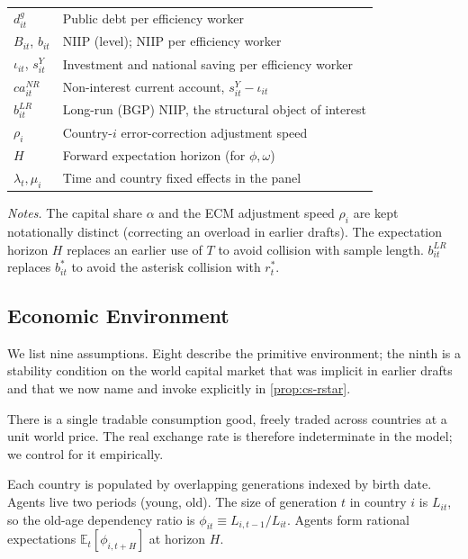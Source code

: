 \begin{table}[t]
\begin{threeparttable}
\begin{tabular}{ll}
$d_{it}^g$ & Public debt per efficiency worker \\
$B_{it}$, $b_{it}$ & NIIP (level); NIIP per efficiency worker \\
$\iota_{it}$, $s_{it}^Y$ & Investment and national saving per efficiency worker \\
$ca_{it}^{NR}$ & Non-interest current account, $s_{it}^Y-\iota_{it}$ \\
$b_{it}^{LR}$ & Long-run (BGP) NIIP, the structural object of interest \\
$\rho_i$ & Country-$i$ error-correction adjustment speed \\
$H$ & Forward expectation horizon (for $\phi,\omega$) \\
$\lambda_t,\mu_i$ & Time and country fixed effects in the panel \\
\bottomrule
\end{tabular}
\begin{tablenotes}\footnotesize
\item \textit{Notes.} The capital share $\alpha$ and the ECM adjustment speed
$\rho_i$ are kept notationally distinct (correcting an overload in earlier
drafts). The expectation horizon $H$ replaces an earlier use of $T$ to avoid
collision with sample length. $b_{it}^{LR}$ replaces $b_{it}^*$ to avoid the
asterisk collision with $r_t^*$.
\end{tablenotes}
\end{threeparttable}
\end{table}

\subsection{Economic Environment}\label{sec:theory:environment}

We list nine assumptions. Eight describe the primitive environment; the ninth
is a stability condition on the world capital market that was implicit in
earlier drafts and that we now name and invoke explicitly in
\cref{prop:cs-rstar}.

\begin{assumption}\label{ass:A1}
There is a single tradable consumption good, freely traded across countries at
a unit world price. The real exchange rate is therefore indeterminate in the
model; we control for it empirically.
\end{assumption}

\begin{assumption}\label{ass:A2}
Each country is populated by overlapping generations indexed by birth date.
Agents live two periods (young, old). The size of generation $t$ in country
$i$ is $L_{it}$, so the old-age dependency ratio is $\phi_{it}\equiv L_{i,t-1}/L_{it}$.
Agents form rational expectations $\mathbb{E}_t[\phi_{i,t+H}]$ at horizon $H$.
\end{assumption}


